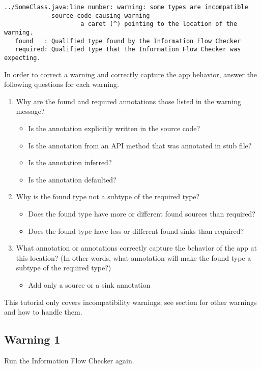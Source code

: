 \begin{Verbatim}  
../SomeClass.java:line number: warning: some types are incompatible 
             source code causing warning
                     a caret (^) pointing to the location of the warning.
   found   : Qualified type found by the Information Flow Checker
   required: Qualified type that the Information Flow Checker was expecting.
\end{Verbatim}
 
In order to correct a warning and correctly capture the app behavior, answer 
the following questions for each warning.
\begin{enumerate}
\item Why are the found and required annotations those listed in the warning message?
   \begin{itemize}
    \item Is the annotation explicitly written in the source code? 
    \item Is the annotation from an API method that was annotated in stub file? 
    \item Is the annotation inferred? 
    \item Is the annotation defaulted? 
    \end{itemize}
\item Why is the found type not a subtype of the required type? 
  \begin{itemize}
   \item Does the found type have more or different found sources than required?
   \item Does the found type have less or different found sinks than required? 
   \end{itemize}
\item What annotation or annotations correctly capture the behavior of the app at
  this location? (In other words, what annotation will make the found type a 
  subtype of the required type?)
   \begin{itemize}
   \item Add only a source or a sink annotation
   \end{itemize}
\end{enumerate}

This tutorial only covers incompatibility warnings; see section  for 
other warnings and how to handle them.

\subsection{Warning 1}
Run the Information Flow Checker again.

